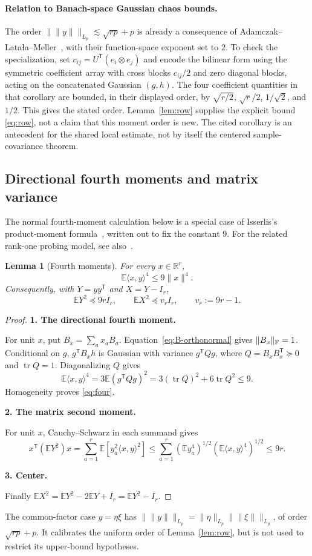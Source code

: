 \documentclass[11pt]{article}
\numberwithin{equation}{section}
\newtheorem{lemma}[theorem]{Lemma}
\theoremstyle{definition}\newtheorem{definition}[theorem]{Definition}
\theoremstyle{remark}\newtheorem{remark}[theorem]{Remark}
\newcommand{\R}{\mathbb R}\newcommand{\E}{\mathbb E}\newcommand{\Prob}{\mathbb P}
\newcommand{\tr}{\operatorname{tr}}\newcommand{\Ent}{\operatorname{Ent}}
\newcommand{\norm}[1]{\lVert#1\rVert}\newcommand{\ip}[2]{\langle#1,#2\rangle}
\newcommand{\step}[1]{\par\addvspace{.65\baselineskip}\Needspace{4\baselineskip}\noindent\textbf{#1}\par\nobreak\smallskip}
\begin{document}
\paragraph{Relation to Banach-space Gaussian chaos bounds.}
The order $\|\norm y\|_{L_p}\lesssim\sqrt{rp}+p$ is already a consequence of
Adamczak--Lata\l a--Meller~\cite[Corollary~12]{ALM}, with their function-space
exponent set to $2$. To check the specialization, set
$c_{ij}=U^{\mathsf T}(e_i\otimes e_j)$ and encode the bilinear form using the
symmetric coefficient array with cross blocks $c_{ij}/2$ and zero diagonal
blocks, acting on the concatenated Gaussian $(g,h)$. The four coefficient
quantities in that corollary are bounded, in their displayed order, by
$\sqrt{r/2}$, $\sqrt r/2$, $1/\sqrt2$, and $1/2$.
This gives the stated order. Lemma~\ref{lem:row} supplies the explicit bound
\eqref{eq:row}, not a claim that this moment order is new. The cited corollary
is an antecedent for the shared local estimate, not by itself the centered
sample-covariance theorem.

\subsection{Directional fourth moments and matrix variance}
The normal fourth-moment calculation below is a special case of Isserlis's
product-moment formula~\cite{Isserlis}, written out to fix the constant $9$.
For the related rank-one probing model, see also~\cite{BK}.
\begin{lemma}[Fourth moments]\label{lem:four}
For every $x\in\R^r$,
\begin{equation}\label{eq:four}
 \E\ip{x}{y}^4\le9\norm x^4.
\end{equation}
Consequently, with $Y=yy^{\mathsf T}$ and $X=Y-I_r$,
\begin{equation}\label{eq:variance}
 \E Y^2\preceq9rI_r,\qquad
 \E X^2\preceq v_r I_r,\qquad v_r:=9r-1.
\end{equation}
\end{lemma}
\begin{proof}
\step{1. The directional fourth moment.}
For unit $x$, put $B_x=\sum_a x_aB_a$. Equation~\eqref{eq:B-orthonormal} gives
$\norm{B_x}_\F=1$. Conditional on $g$, $g^{\mathsf T}B_xh$ is Gaussian with
variance $g^{\mathsf T}Qg$, where $Q=B_xB_x^{\mathsf T}\succeq0$ and $\tr Q=1$.
Diagonalizing $Q$ gives
\[
 \E\ip{x}{y}^4=3\E(g^{\mathsf T}Qg)^2
 =3(\tr Q)^2+6\tr Q^2\le9.
\]
Homogeneity proves \eqref{eq:four}.

\step{2. The matrix second moment.}
For unit $x$, Cauchy--Schwarz in each summand gives
\[
 x^{\mathsf T}(\E Y^2)x
 =\sum_{a=1}^r\E[y_a^2\ip{x}{y}^2]
 \le\sum_{a=1}^r(\E y_a^4)^{1/2}(\E\ip{x}{y}^4)^{1/2}
 \le9r.
\]

\step{3. Center.}
Finally $\E X^2=\E Y^2-2\E Y+I_r=\E Y^2-I_r$.
\end{proof}
The common-factor case $y=\eta\xi$ has
$\|\norm y\|_{L_p}=\|\eta\|_{L_p}\|\norm\xi\|_{L_p}$, of order
$\sqrt{rp}+p$. It calibrates the uniform order of Lemma~\ref{lem:row}, but is not
used to restrict its upper-bound hypotheses.
\end{document}

